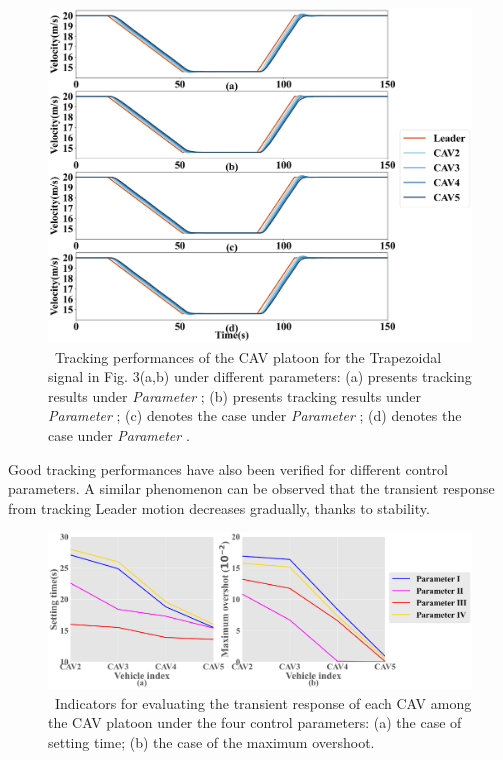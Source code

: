 \documentclass[a4paper]{cas-sc}
\begin{document}
\begin{figure}
  \centering
  \includegraphics[width=14cm]{figs/fig9.png}
  \caption{~Tracking performances of the CAV platoon for the Trapezoidal signal in Fig. 3(a,b) under different parameters: (a) presents tracking results under \textit{Parameter \uppercase\expandafter{}}; (b) presents tracking results under \textit{Parameter \uppercase\expandafter{}}; (c) denotes the case under \textit{Parameter \uppercase\expandafter{}}; (d) denotes the case under \textit{Parameter \uppercase\expandafter{}}.}
  \label{fig9}
\end{figure}

Good tracking performances have also been verified for different control parameters. A similar phenomenon can be observed that the transient response from tracking Leader motion decreases gradually, thanks to stability.

\begin{figure}
  \centering
  \includegraphics[width=14cm]{figs/fig10.png}
  \caption{~Indicators for evaluating the transient response of each CAV among the CAV platoon under the four control parameters: (a) the case of setting time; (b) the case of the maximum overshoot.}
  \label{fig10}
\end{figure}
\end{document}
